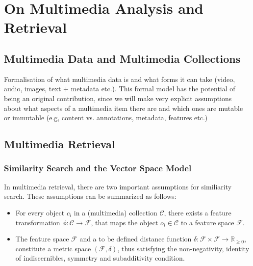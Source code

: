 \chapter{On Multimedia Analysis and Retrieval}
\label{chapter:theory_multimedia_analysis_and_retrieval}


\section{Multimedia Data and Multimedia Collections}
\label{section:multmedia_data}
Formalisation of what multimedia data is and what forms it can take (video, audio, images, text + metadata etc.). This formal model has the potential of being an original contribution, since we will make very explicit assumptions about what aspects of a multimedia item there are and which ones are mutable or immutable (e.g, content vs. annotations, metadata, features etc.)

\section{Multimedia Retrieval}

\subsection{Similarity Search and the Vector Space Model}

In multimedia retrieval, there are two important assumptions for similiarity search. These assumptions can be summarized as follows:

\begin{itemize}
    \item For every object $c_{i}$ in a (multimedia) collection $\mathcal{C}$, there exists a feature transformation $\phi \colon \mathcal{C} \to \mathcal{F}$, that maps the object $o_{i} \in \mathcal{C}$ to a feature space $\mathcal{F}$.
    \item The feature space $\mathcal{F}$ and a to be defined distance function $\delta \colon \mathcal{F} \times \mathcal{F} \to \mathbb{R}_{\geq 0}$, constitute a metric space $(\mathcal{F},\delta)$, thus satisfying the non-negativity, identity of indiscernibles, symmetry and subadditivity condition.
\end{itemize}

